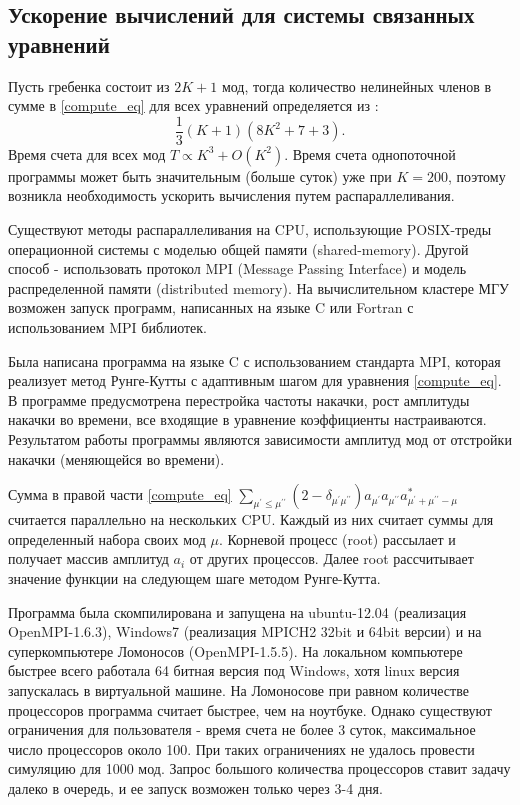 \subsection{Ускорение вычислений для системы связанных уравнений}
Пусть гребенка состоит из $2K+1$ мод, тогда количество нелинейных членов в сумме в \eqref{compute_eq} для всех уравнений определяется из \cite{Gorodetsky}:
\begin{equation}
\frac{1}{3}(K+1)(8K^2+7+3).
\end{equation}
Время счета для всех мод $T\varpropto K^3+O(K^2)$. Время счета однопоточной программы может быть значительным (больше суток) уже при $K=200$, поэтому возникла необходимость ускорить вычисления путем распараллеливания.

Существуют методы распараллеливания на CPU, использующие POSIX-треды операционной системы с моделью общей памяти (shared-memory). Другой способ - использовать протокол MPI (Message Passing Interface) и модель распределенной памяти (distributed memory). На вычислительном кластере МГУ возможен запуск программ, написанных на языке C или Fortran с использованием MPI библиотек.

Была написана программа на языке C с использованием стандарта MPI, которая реализует метод Рунге-Кутты с адаптивным шагом для уравнения \eqref{compute_eq}. В программе предусмотрена перестройка частоты накачки, рост амплитуды накачки во времени, все входящие в уравнение коэффициенты настраиваются. Результатом работы программы являются зависимости амплитуд мод от отстройки накачки (меняющейся во времени).

Сумма в правой части \eqref{compute_eq} $\sum_{\mu^\prime\le\mu^{\prime\prime}} (2-\delta_{\mu^\prime\mu^{\prime\prime}})a_{\mu^\prime}a_{\mu^{\prime\prime}}a_{\mu^\prime+\mu^{\prime\prime}-\mu}^*$ считается параллельно на нескольких CPU. Каждый из них считает суммы для определенный набора своих мод $\mu$. Корневой процесс (root) рассылает и получает массив амплитуд $a_i$ от других процессов. Далее root рассчитывает значение функции на следующем шаге методом Рунге-Кутта.

Программа была скомпилирована и запущена на ubuntu-12.04 (реализация OpenMPI-1.6.3), Windows7 (реализация MPICH2 32bit и 64bit версии) и на суперкомпьютере Ломоносов (OpenMPI-1.5.5). На локальном компьютере быстрее всего работала 64 битная версия под Windows, хотя linux версия запускалась в виртуальной машине. На Ломоносове при равном количестве процессоров программа считает быстрее, чем на ноутбуке. Однако существуют ограничения для пользователя - время счета не более 3 суток, максимальное число процессоров около 100. При таких ограничениях не удалось провести симуляцию для 1000 мод. Запрос большого количества процессоров ставит задачу далеко в очередь, и ее запуск возможен только через 3-4 дня.

